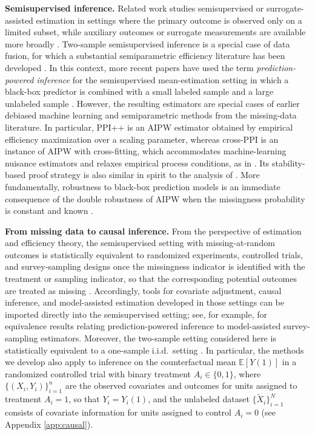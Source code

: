\documentclass{article}
\theoremstyle{plain}
\theoremstyle{definition}
\newcommand{\1}{\mathbbm{1}}
\begin{document}
 


\textbf{Semisupervised inference.} Related work studies semisupervised or surrogate-assisted estimation in settings where the primary outcome is observed only on a limited subset, while auxiliary outcomes or surrogate measurements are available more broadly \citep{pepe1992inference,pepe1994auxiliary,chen2000miscellanea,chen2008improving,cheng2021robust,ji2025predictions,kallus2025role}. Two-sample semisupervised inference is a special case of data fusion, for which a substantial semiparametric efficiency literature has been developed \citep{li2023efficient,li2025data,graham2024towards,xu2025unified}. In this context, more recent papers have used the term \emph{prediction-powered inference} for the semisupervised mean-estimation setting in which a black-box predictor is combined with a small labeled sample and a large unlabeled sample \citep{ppi2023,angelopoulos2023ppi,crossppi2024,xu2025unified,song2026demystifying}. However, the resulting estimators are special cases of earlier debiased machine learning and semiparametric methods from the missing-data literature. In particular, PPI++ is an AIPW estimator obtained by empirical efficiency maximization \citep{rubin2008empirical} over a scaling parameter, whereas cross-PPI \citep{crossppi2024} is an instance of AIPW \citep{robins1995analysis} with cross-fitting, which accommodates machine-learning nuisance estimators and relaxes empirical process conditions, as in \citet{schick1986asymptotically,zheng2010asymptotic,DoubleML}. Its stability-based proof strategy is also similar in spirit to the analysis of \citet{chen2022stable}. More fundamentally, robustness to black-box prediction models is an immediate consequence of the double robustness of AIPW when the missingness probability is constant and known \citep{bang2005doubly}.

\textbf{From missing data to causal inference.} From the perspective of estimation and efficiency theory, the semisupervised setting with missing-at-random outcomes is statistically equivalent to randomized experiments, controlled trials, and survey-sampling designs once the missingness indicator is identified with the treatment or sampling indicator, so that the corresponding potential outcomes are treated as missing \citep{rubin1978bayesian,vanderlaanunified,licausal}. Accordingly, tools for covariate adjustment, causal inference, and model-assisted estimation developed in those settings can be imported directly into the semisupervised setting; see, for example, \citet{mozer2026ppi} for equivalence results relating prediction-powered inference to model-assisted survey-sampling estimators. Moreover, the two-sample setting considered here is statistically equivalent to a one-sample i.i.d.\ setting \citep{li2023efficient}. In particular, the methods we develop also apply to inference on the counterfactual mean \(\mathbb{E}[Y(1)]\) in a randomized controlled trial with binary treatment \(A_i \in \{0,1\}\), where \(\{(X_i, Y_i)\}_{i=1}^n\) are the observed covariates and outcomes for units assigned to treatment \(A_i=1\), so that \(Y_i = Y_i(1)\), and the unlabeled dataset \(\{\widetilde X_i\}_{i=1}^N\) consists of covariate information for units assigned to control \(A_i=0\) (see Appendix \ref{app:causal}).
\end{document}
